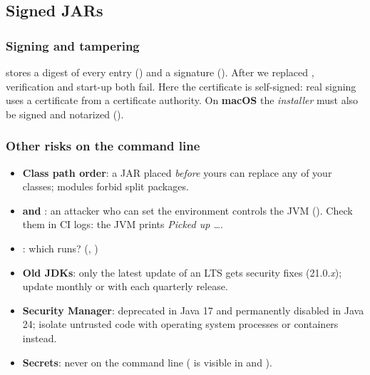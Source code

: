 \documentclass[aspectratio=169,10pt,compress]{beamer}
\newcommand{\mac}{\textbf{macOS}}
\begin{document}
\subsection[Signing]{Signed JARs}




\begin{frame}[t,fragile] \frametitle{Signing and tampering}

  \vspace{0.1em}
  \small
   stores a digest of every entry () and a signature ().
  After we replaced , verification and start-up both fail. Here the certificate is self-signed: real signing uses a
  certificate from a certificate authority. On \mac{} the \emph{installer} must also be signed and notarized ().
\end{frame}




\begin{frame}[t,fragile] \frametitle{Other risks on the command line}
  \begin{itemize}\small
    \item \textbf{Class path order}: a JAR placed \emph{before} yours can replace any of your classes; modules forbid split packages.
    \item \textbf{ and }: an attacker who can set the environment controls the JVM
      (). Check them in CI logs: the JVM prints \emph{Picked up \dots}.
    \item \textbf{}: which  runs? (, )
    \item \textbf{Old JDKs}: only the latest update of an LTS gets security fixes (21.0.\emph{x}); update monthly or with each quarterly release.
    \item \textbf{Security Manager}: deprecated in Java 17 and permanently disabled in Java 24; isolate untrusted code with
      operating system processes or containers instead.
    \item \textbf{Secrets}: never on the command line ( is visible in  and ).
  \end{itemize}
\end{frame}
\end{document}

